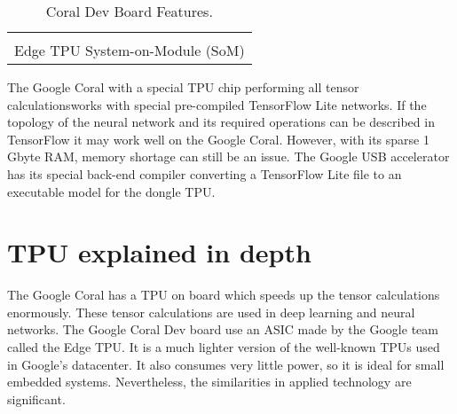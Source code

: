 \begin{table}[htb]
	\centering
	\begin{tabular}{c}
	\hline \\
Edge TPU System-on-Module (SoM)\\
\hline
	\end{tabular}
	\caption{Coral Dev Board Features.}
	\label{tab:hard-devboard-spec}
\end{table}
%
\noindent The Google Coral with a special TPU chip
performing all tensor calculationsworks with special 
pre-compiled TensorFlow Lite networks. If the topology of the neural network and
its required operations can be described in TensorFlow it may work well on the
Google Coral. However, with its sparse 1 Gbyte RAM, memory shortage can still be
an issue. The Google USB accelerator has its special back-end compiler
converting a TensorFlow Lite file to an executable model for the dongle
TPU.
% 
%
\section{TPU explained in depth}
\label{sec:hard-tpu}
The Google Coral has a TPU on board which speeds up the tensor calculations
enormously. These tensor calculations are used in deep learning and neural
networks. \hfill \break 
The Google Coral Dev board use an ASIC made by the Google team called the Edge 
TPU. It is a much lighter version of the well-known TPUs used in Google's 
datacenter. \hfill \break
It also consumes very little power, so it is ideal for small embedded systems. 
Nevertheless, the similarities in applied technology are significant.\cite{TPU:explained} 
%
